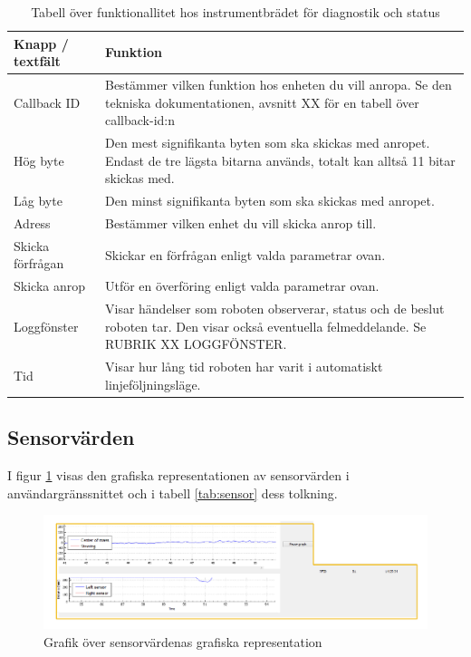 \documentclass[a4paper,12pt]{article}
\begin{document}
\begin{table}[H]
    \centering
    \begin{tabularx}{\textwidth}{|l|X|}
        \hline \textbf{Knapp / textfält} & \textbf{Funktion} \\ \hline
        Callback ID & Bestämmer vilken funktion hos enheten du vill anropa. Se den tekniska dokumentationen, avsnitt XX för en tabell över callback-id:n \\ \hline
        Hög byte & Den mest signifikanta byten som ska skickas med anropet. Endast de tre lägsta bitarna används, totalt kan alltså 11 bitar skickas med. \\ \hline
        Låg byte & Den minst signifikanta byten som ska skickas med anropet. \\ \hline
        Adress & Bestämmer vilken enhet du vill skicka anrop till. \\ \hline
        Skicka förfrågan & Skickar en förfrågan enligt valda parametrar ovan. \\ \hline
        Skicka anrop & Utför en överföring enligt valda parametrar ovan. \\ \hline
        Loggfönster & Visar händelser som roboten observerar, status och de beslut roboten tar. Den visar också eventuella felmeddelande. Se RUBRIK XX LOGGFÖNSTER.\\ \hline
        Tid & Visar hur lång tid roboten har varit i automatiskt linjeföljningsläge. \\ \hline
    \end{tabularx}
\caption{Tabell över funktionallitet hos instrumentbrädet för diagnostik och status}
\label{tab:diag}
\end{table}

\subsection{Sensorvärden}
\label{subsec:sensor}
I figur \ref{fig:pc_sensor} visas den grafiska representationen av sensorvärden i användargränssnittet och i tabell \ref{tab:sensor} dess tolkning.

\begin{figure}[H]
	\centering
	\includegraphics[width=1.0\textwidth]{sensor.pdf}
	\caption{Grafik över sensorvärdenas grafiska representation}
	\label{fig:pc_sensor}
\end{figure}
\end{document}
